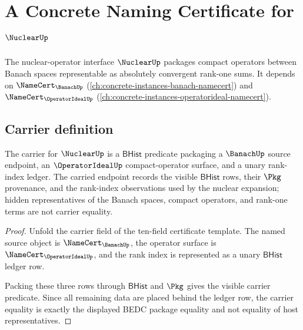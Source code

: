 \chapter{A Concrete Naming Certificate for $\NuclearUp$}
\label{ch:concrete-instances-nuclear-namecert}

The nuclear-operator interface $\NuclearUp$ packages compact operators between Banach spaces representable as absolutely convergent rank-one sums. It depends on $\NameCert_{\BanachUp}$ (\autoref{ch:concrete-instances-banach-namecert}) and $\NameCert_{\OperatorIdealUp}$ (\autoref{ch:concrete-instances-operatorideal-namecert}).

\section{Carrier definition}
\label{sec:nuclear-carrier}

\begin{theorem}\label{thm:nuclear-carrier-obligation}
The carrier for $\NuclearUp$ is a $\mathsf{BHist}$ predicate packaging a $\BanachUp$ source endpoint, an $\OperatorIdealUp$ compact-operator surface, and a unary rank-index ledger. The carried endpoint records the visible $\mathsf{BHist}$ rows, their $\Pkg$ provenance, and the rank-index observations used by the nuclear expansion; hidden representatives of the Banach spaces, compact operators, and rank-one terms are not carrier equality.
\end{theorem}
\begin{proof}
Unfold the carrier field of the ten-field certificate template. The named source object is $\NameCert_{\BanachUp}$, the operator surface is $\NameCert_{\OperatorIdealUp}$, and the rank index is represented as a unary $\mathsf{BHist}$ ledger row.

Packing these three rows through $\mathsf{BHist}$ and $\Pkg$ gives the visible carrier predicate. Since all remaining data are placed behind the ledger row, the carrier equality is exactly the displayed BEDC package equality and not equality of host representatives.
\end{proof}


